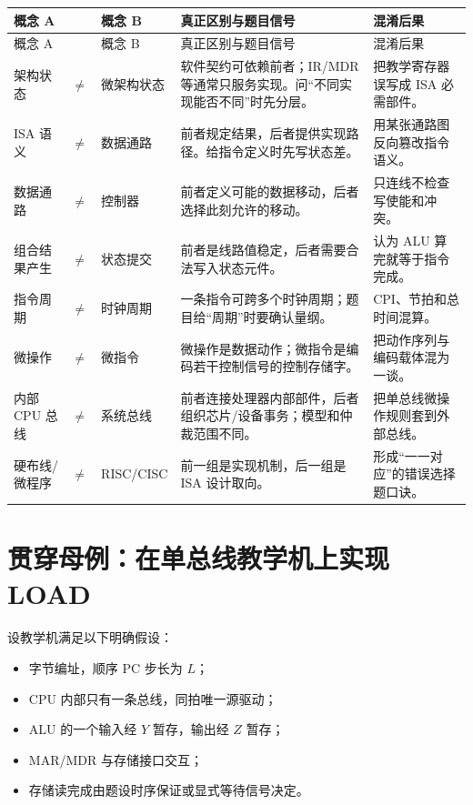 \documentclass[UTF8,fontset=fandol,11pt,a4paper]{ctexart}
\renewcommand{\arraystretch}{1.22}
\begin{document}
\begingroup
\footnotesize
\renewcommand{\arraystretch}{1.28}
\begin{longtable}{L{2.25cm}C{0.45cm}L{2.25cm}L{6.0cm}L{3.0cm}}
\toprule
概念 A & & 概念 B & 真正区别与题目信号 & 混淆后果 \\
\midrule
\endfirsthead
\toprule
概念 A & & 概念 B & 真正区别与题目信号 & 混淆后果 \\
\midrule
\endhead
架构状态 & $\neq$ & 微架构状态 & 软件契约可依赖前者；IR/MDR 等通常只服务实现。问“不同实现能否不同”时先分层。 & 把教学寄存器误写成 ISA 必需部件。 \\
\addlinespace
ISA 语义 & $\neq$ & 数据通路 & 前者规定结果，后者提供实现路径。给指令定义时先写状态差。 & 用某张通路图反向篡改指令语义。 \\
\addlinespace
数据通路 & $\neq$ & 控制器 & 前者定义可能的数据移动，后者选择此刻允许的移动。 & 只连线不检查写使能和冲突。 \\
\addlinespace
组合结果产生 & $\neq$ & 状态提交 & 前者是线路值稳定，后者需要合法写入状态元件。 & 认为 ALU 算完就等于指令完成。 \\
\addlinespace
指令周期 & $\neq$ & 时钟周期 & 一条指令可跨多个时钟周期；题目给“周期”时要确认量纲。 & CPI、节拍和总时间混算。 \\
\addlinespace
微操作 & $\neq$ & 微指令 & 微操作是数据动作；微指令是编码若干控制信号的控制存储字。 & 把动作序列与编码载体混为一谈。 \\
\addlinespace
内部 CPU 总线 & $\neq$ & 系统总线 & 前者连接处理器内部部件，后者组织芯片/设备事务；模型和仲裁范围不同。 & 把单总线微操作规则套到外部总线。 \\
\addlinespace
硬布线/微程序 & $\neq$ & RISC/CISC & 前一组是实现机制，后一组是 ISA 设计取向。 & 形成“一一对应”的错误选择题口诀。 \\
\bottomrule
\end{longtable}
\endgroup

\section{贯穿母例：在单总线教学机上实现 LOAD}

设教学机满足以下明确假设：
\begin{itemize}
  \item 字节编址，顺序 PC 步长为 $L$；
  \item CPU 内部只有一条总线，同拍唯一源驱动；
  \item ALU 的一个输入经 $Y$ 暂存，输出经 $Z$ 暂存；
  \item MAR/MDR 与存储接口交互；
  \item 存储读完成由题设时序保证或显式等待信号决定。
\end{itemize}
\end{document}
